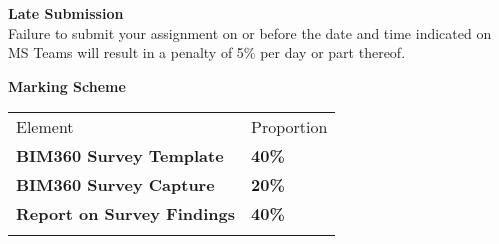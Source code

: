\textbf{Late Submission}\\
Failure to submit your assignment on or before the date and time indicated on MS Teams will result in a penalty of 5\% per day or part thereof.

\vspace{0.5cm}
\textbf{Marking Scheme}

\begin{table}[h!]
     \begin{center}
     \begin{tabular}{p{5cm}  p{5cm} }
     \toprule
      \textbf\large{Element} & \textbf\large{Proportion} \\ 
    \cmidrule(r){1-1}\cmidrule(lr){2-2}
      \textbf{BIM360 Survey Template} & \textbf{40\%}\\
      \textbf{BIM360 Survey Capture} & \textbf{20\%}\\
      \textbf{Report on Survey Findings} & \textbf{40\%}\\
      \\ \bottomrule
      \end{tabular}
      \label{tbl:markSchemeAsmt3}
      \end{center}
 \end{table}


